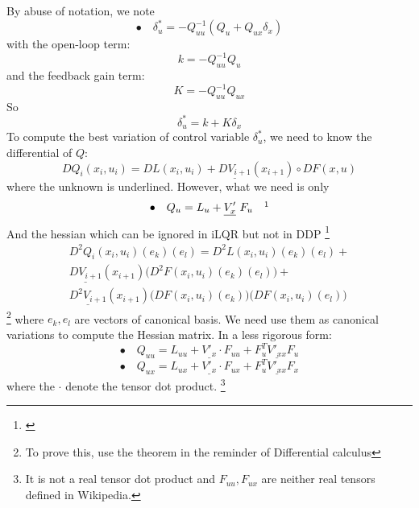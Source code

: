 \documentclass{report}
\begin{document}
By abuse of notation, we note
\begin{equation}
\bullet \quad \delta_u^* = - Q_{uu}^{-1} (Q_u + Q_{ux} \delta_x)
\end{equation}
with the open-loop term:
\begin{equation}
k = - Q_{uu}^{-1} Q_u
\end{equation}
and the feedback gain term:
\begin{equation}
K = - Q_{uu}^{-1} Q_{ux}
\end{equation}
So
\begin{equation}
 \delta_u^* = k + K \delta_x
\end{equation}
To compute the best variation of control variable $\delta_u^*$, we need to know the differential of $Q$:
\begin{equation}
    D Q_i (x_i, u_i) = DL(x_i,u_i) + \underline{DV_{i+1}}(x_{i+1}) \circ DF(x,u)
\end{equation}
where the unknown is underlined. However, what we need is only
\begin{equation}
\bullet \quad Q_u = L_u + \underline{V'_x}   \ F_u \quad \footnotemark
\end{equation}
And the hessian which can be ignored in iLQR but not in DDP 
\footnote{\cite{TassaIROS12}} 
\begin{multline}
     D^2 Q_i (x_i ,u_i) (e_k) (e_l) = D^2 L (x_i ,u_i) (e_k) (e_l) + \\
        \underline{DV_{i+1}}(x_{i+1})\big(D^2 F (x_i ,u_i) (e_k) (e_l)\big) +\\
        \underline{D^2 V_{i+1}}(x_{i+1}) \big( DF(x_i ,u_i)(e_k) \big) \big( DF(x_i ,u_i)(e_l) \big)
\end{multline}
\footnote{To prove this, use the theorem in the reminder of Differential calculus}
where $e_k, e_l$ are vectors of canonical basis. We need use them as canonical variations to compute the Hessian matrix. In a less rigorous form:
\begin{equation}
\bullet \quad Q_{uu} = L_{uu} + \underline{V'_x} \cdot F_{uu} + F_u^T \underline{V'_{xx}} F_u
\end{equation}
\begin{equation}
\bullet \quad Q_{ux} = L_{ux} + \underline{V'_x} \cdot F_{ux} + F_u^T \underline{V'_{xx}} F_x
\end{equation}
where the $\cdot$ denote the tensor dot product.
\footnote{It is not a real tensor dot product and $F_{uu}, F_{ux}$ are neither real tensors defined in Wikipedia.}
\end{document}
